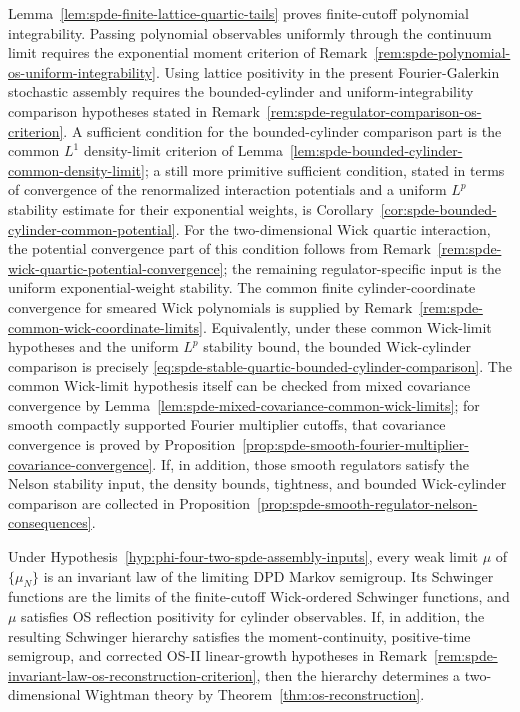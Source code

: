 \begin{hypothesis}
\begin{enumerate}[label=(\alph*)]
  Lemma~\ref{lem:spde-finite-lattice-quartic-tails} proves
  finite-cutoff polynomial integrability.  Passing polynomial observables
  uniformly through the continuum limit requires the exponential moment
  criterion of
  Remark~\ref{rem:spde-polynomial-os-uniform-integrability}.  Using
  lattice positivity in the present Fourier-Galerkin stochastic assembly
  requires the bounded-cylinder and uniform-integrability comparison
  hypotheses stated in
  Remark~\ref{rem:spde-regulator-comparison-os-criterion}.  A
  sufficient condition for the bounded-cylinder comparison part is the
  common \(L^1\) density-limit criterion of
  Lemma~\ref{lem:spde-bounded-cylinder-common-density-limit}; a
  still more primitive sufficient condition, stated in terms of convergence
  of the renormalized interaction potentials and a uniform \(L^p\) stability
  estimate for their exponential weights, is
  Corollary~\ref{cor:spde-bounded-cylinder-common-potential}.  For the
  two-dimensional Wick quartic interaction, the potential convergence part
  of this condition follows from
  Remark~\ref{rem:spde-wick-quartic-potential-convergence}; the remaining
  regulator-specific input is the uniform exponential-weight stability.
  The common finite cylinder-coordinate convergence for smeared Wick
  polynomials is supplied by
  Remark~\ref{rem:spde-common-wick-coordinate-limits}.  Equivalently,
  under these common Wick-limit hypotheses and the uniform \(L^p\) stability
  bound, the bounded Wick-cylinder comparison is precisely
  \eqref{eq:spde-stable-quartic-bounded-cylinder-comparison}.
  The common Wick-limit hypothesis itself can be checked from mixed
  covariance convergence by
  Lemma~\ref{lem:spde-mixed-covariance-common-wick-limits}; for
  smooth compactly supported Fourier multiplier cutoffs, that covariance
  convergence is proved by
  Proposition~\ref{prop:spde-smooth-fourier-multiplier-covariance-convergence}.
  If, in addition, those smooth regulators satisfy the Nelson stability
  input, the density bounds, tightness, and bounded Wick-cylinder comparison
  are collected in
  Proposition~\ref{prop:spde-smooth-regulator-nelson-consequences}.
\end{enumerate}
\end{hypothesis}

\begin{theorem}
\label{thm:phi-four-two-spde-main-theorem}
Under Hypothesis~\ref{hyp:phi-four-two-spde-assembly-inputs}, every weak limit
\(\mu\) of \(\{\mu_N\}\) is an invariant law of the
limiting DPD Markov semigroup.  Its Schwinger functions are the limits of
the finite-cutoff Wick-ordered Schwinger functions, and \(\mu\) satisfies OS
reflection positivity for cylinder observables.  If, in addition, the
resulting Schwinger hierarchy satisfies the moment-continuity,
positive-time semigroup, and corrected OS-II linear-growth hypotheses in
Remark~\ref{rem:spde-invariant-law-os-reconstruction-criterion}, then
the hierarchy determines a two-dimensional Wightman theory by
Theorem~\ref{thm:os-reconstruction}.
\end{theorem}

